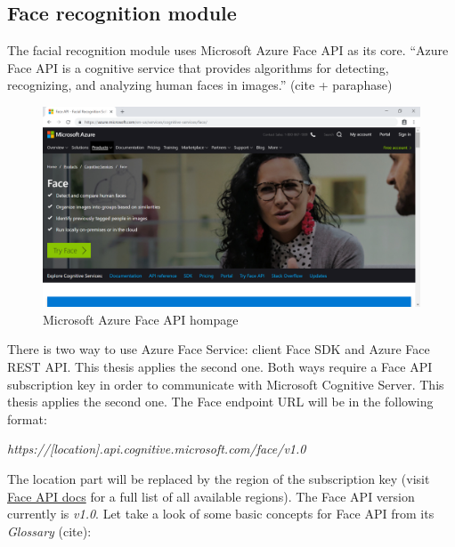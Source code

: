 \subsection{Face recognition module}
The facial recognition module uses Microsoft Azure Face API as its core. “Azure Face API is a cognitive service that provides algorithms for detecting, recognizing, and analyzing human faces in images.” (cite + paraphase)
\begin{center}
    \begin{figure}[H]
    \centering
    \includegraphics[width=1\columnwidth]{images/chap4/face-api-homepage.PNG}
    \caption{Microsoft Azure Face API hompage}
    \end{figure}
\end{center}
There is two way to use Azure Face Service: client Face SDK and Azure Face REST API. This thesis applies the second one. Both ways require a Face API subscription key in order to communicate with Microsoft Cognitive Server. This thesis applies the second one. The Face endpoint URL will be in the following format:
\begin{center}
\textit{https://[location].api.cognitive.microsoft.com/face/v1.0}
\end{center}
The location part will be replaced by the region of the subscription key (visit \href{https://westus.dev.cognitive.microsoft.com/docs/services/563879b61984550e40cbbe8d/operations/563879b61984550f30395236}{Face API docs} for a full list of all available regions). The Face API version currently is \textit{v1.0}.
Let take a look of some basic concepts for Face API from its \textit{Glossary} (cite):
